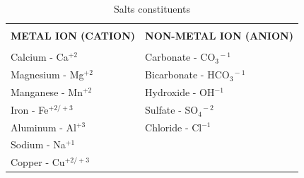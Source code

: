 \documentclass{article}
\begin{document}
\begin{table}[h!]    
\begin{center}
     \begin{tabular}{ | m{5cm}  m{5cm} |}
     \hline
           \multicolumn{1}{|c}{} & \multicolumn{1}{c|}{} \\
      \multicolumn{1}{|c}{\textbf{METAL ION (CATION)}} & \multicolumn{1}{c|}{\textbf{NON-METAL ION (ANION)}} \\
            \multicolumn{1}{|c}{} & \multicolumn{1}{c|}{}\\
      Calcium - Ca$^{+2}$ & Carbonate - CO$_3^{\enspace -1}$\\
      Magnesium - Mg$^{+2}$ & Bicarbonate - HCO$_3^{\enspace -1}$\\
      Manganese - Mn$^{+2}$ & Hydroxide - OH$^{-1}$\\
      Iron - Fe$^{+2/+3}$ & Sulfate - SO$_4^{\enspace -2}$\\
      Aluminum - Al$^{+3}$ & Chloride - Cl$^{-1}$\\
      Sodium - Na$^{+1}$ & \\
      Copper - Cu$^{+2/+3}$ & \\
          \hline
                    \end{tabular}
     \caption{Salts constituents}
     \label{Salts constituents}
     
\end{center}
     \end{table}
     
     
     
\end{document}
